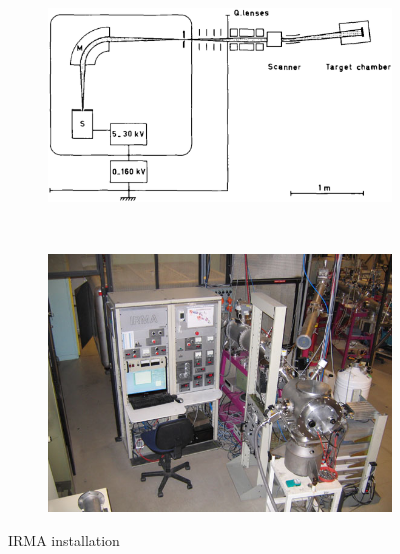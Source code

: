 \begin{figure}[!ht]
	\begin{subfigure}{0.5\textwidth}
		\includegraphics[width=\textwidth]{04_IPHI_Test/figures/fig000_IRMA01.png}
		\caption{}
		\label{}
	\end{subfigure}
	~
	\begin{subfigure}{0.5\textwidth}
		\includegraphics[width=\textwidth]{04_IPHI_Test/figures/fig000_IRMA02.jpg}
		\caption{}
		\label{}
	\end{subfigure}
	\caption[IRMA installation]{IRMA installation}
	\label{chap4:IRMA_facility}
\end{figure}
